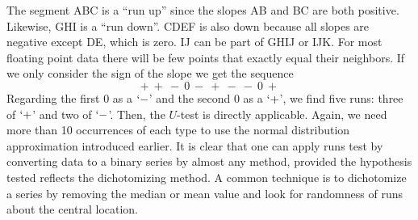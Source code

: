 
The segment ABC is a ``run up'' since the slopes AB and BC are both positive.  Likewise, GHI is a 
``run down''.  CDEF is also down because all slopes are negative except DE, which is zero.  IJ can 
be part of GHIJ or IJK.  For most floating point data there will be few points that exactly equal 
their neighbors.  If we only consider the sign of the slope we get the sequence
$$
+\ +\ -\ 0\ -\ +\ -\ -\ 0\ +
$$
Regarding the first 0 as a $`-$' and the second 0 as a $`+$', we find five runs: three of $`+$' and two of $`-$'.  Then, the $U$-test is directly 
applicable.  Again, we need more than 10 occurrences of each type to use the normal distribution 
approximation introduced earlier.  It is clear that one can apply runs test by converting data to a binary series
by almost any method, provided the hypothesis tested reflects the dichotomizing method.  A 
common technique is to dichotomize a series by removing the median or mean value and look 
for randomness of runs about the central location. 
